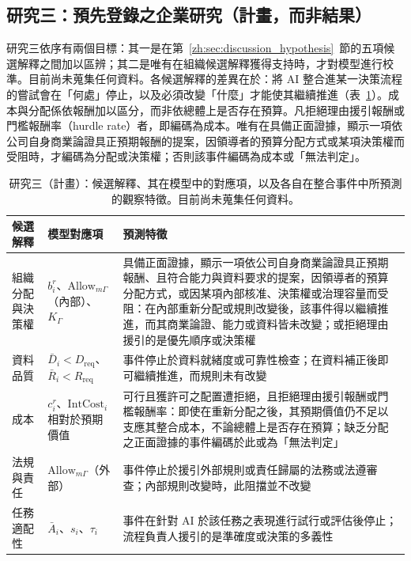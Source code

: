 \subsection{研究三：預先登錄之企業研究（計畫，而非結果）}
\label{zh:sec:mlp_study3}

研究三依序有兩個目標：其一是在第~\ref{zh:sec:discussion_hypothesis}~節的五項候選解釋之間加以區辨；其二是唯有在組織候選解釋獲得支持時，才對模型進行校準。目前尚未蒐集任何資料。各候選解釋的差異在於：將 AI 整合進某一決策流程的嘗試會在「何處」停止，以及必須改變「什麼」才能使其繼續推進（表~\ref{zh:tab:back_study3_rivals}）。成本與分配係依報酬加以區分，而非依總體上是否存在預算。凡拒絕理由援引報酬或門檻報酬率（hurdle rate）者，即編碼為成本。唯有在具備正面證據，顯示一項依公司自身商業論證具正預期報酬的提案，因領導者的預算分配方式或某項決策權而受阻時，才編碼為分配或決策權；否則該事件編碼為成本或「無法判定」。

\begin{table}[tbp]
\centering
\caption{研究三（計畫）：候選解釋、其在模型中的對應項，以及各自在整合事件中所預測的觀察特徵。目前尚未蒐集任何資料。}
\label{zh:tab:back_study3_rivals}
\footnotesize
\begin{tabular}{p{3.0cm}p{3.2cm}p{8.0cm}}
\toprule
候選解釋 & 模型對應項 & 預測特徵 \tabularnewline
\midrule
\raggedright 組織分配與決策權 & \raggedright $b_i^r$、$\mathrm{Allow}_{m\Gamma}$（內部）、$K_\Gamma$ & \raggedright 具備正面證據，顯示一項依公司自身商業論證具正預期報酬、且符合能力與資料要求的提案，因領導者的預算分配方式，或因某項內部核准、決策權或治理容量而受阻：在內部重新分配或規則改變後，該事件得以繼續推進，而其商業論證、能力或資料皆未改變；或拒絕理由援引的是優先順序或決策權 \tabularnewline
\raggedright 資料品質 & \raggedright $\bar D_i<D_{\mathrm{req}}$、$\bar R_i<R_{\mathrm{req}}$ & \raggedright 事件停止於資料就緒度或可靠性檢查；在資料補正後即可繼續推進，而規則未有改變 \tabularnewline
\raggedright 成本 & \raggedright $c_i^r$、$\mathrm{IntCost}_i$ 相對於預期價值 & \raggedright 可行且獲許可之配置遭拒絕，且拒絕理由援引報酬或門檻報酬率：即使在重新分配之後，其預期價值仍不足以支應其整合成本，不論總體上是否存在預算；缺乏分配之正面證據的事件編碼於此或為「無法判定」 \tabularnewline
\raggedright 法規與責任 & \raggedright $\mathrm{Allow}_{m\Gamma}$（外部） & \raggedright 事件停止於援引外部規則或責任歸屬的法務或法遵審查；內部規則改變時，此阻擋並不改變 \tabularnewline
\raggedright 任務適配性 & \raggedright $\bar A_i$、$s_i$、$\tau_i$ & \raggedright 事件在針對 AI 於該任務之表現進行試行或評估後停止；流程負責人援引的是準確度或決策的多義性 \tabularnewline
\bottomrule
\end{tabular}
\end{table}

